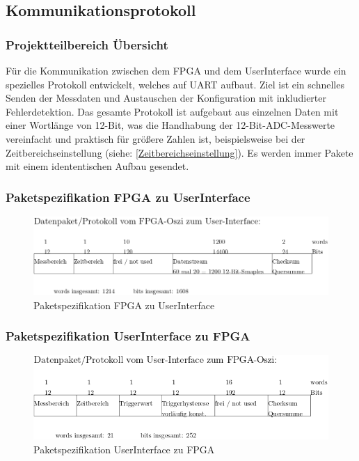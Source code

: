 \subsection{Kommunikationsprotokoll}\label{Protokoll}
\subsubsection{Projektteilbereich Übersicht}
Für die Kommunikation zwischen dem FPGA und dem UserInterface wurde ein spezielles Protokoll entwickelt, welches auf UART aufbaut. Ziel ist ein schnelles Senden der Messdaten und Austauschen der Konfiguration mit inkludierter Fehlerdetektion. Das gesamte Protokoll ist aufgebaut aus einzelnen Daten mit einer Wortlänge von 12-Bit, was die Handhabung der 12-Bit-ADC-Messwerte vereinfacht und praktisch für größere Zahlen ist, beispielsweise bei der Zeitbereichseinstellung (siehe: \ref{Zeitbereichseinstellung}). Es werden immer Pakete mit einem idententischen Aufbau gesendet.
\subsubsection{Paketspezifikation FPGA zu UserInterface}
\begin{figure}[!h]
\begin{center}
\includegraphics[width=15cm]{SAUER/Grafiken/Kommunikationsprotokoll/Datenstreampaket.png}
\caption{Paketspezifikation FPGA zu UserInterface}
\label{Datenstreampaket}
\end{center}
\end{figure}
\subsubsection{Paketspezifikation UserInterface zu FPGA}
\begin{figure}[h]
\begin{center}
\includegraphics[width=15cm]{SAUER/Grafiken/Kommunikationsprotokoll/Controllerpaket.png}
\caption{Paketspezifikation UserInterface zu FPGA}
\label{Controllerpaket}
\end{center}
\end{figure}
